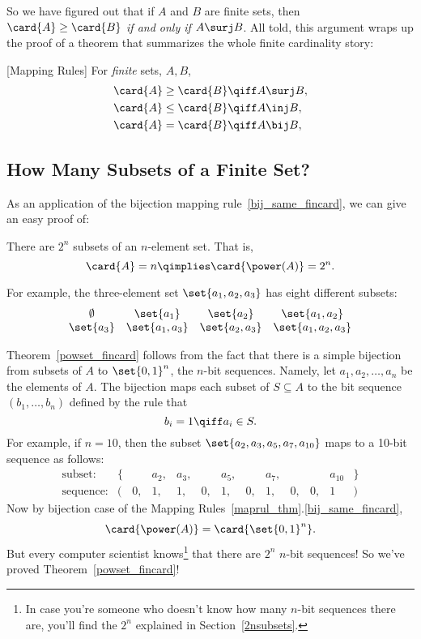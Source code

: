 So we have figured out that if $A$ and $B$ are finite sets, then
$\card{A} \geq \card{B}$ \emph{if and only if} $A \surj B$.  All told,
this argument wraps up the proof of a theorem that summarizes the
whole finite cardinality story:
\begin{theorem}\label{maprul_thm}
[Mapping Rules] \mbox{} For \emph{finite} sets, $A,B$,
\begin{align}
\card{A} \geq \card{B} & \qiff A \surj B,\label{sur_ge_fincard}\\
\card{A} \leq \card{B} & \qiff A \inj B,\label{inj_le_fincard}\\
\card{A} = \card{B} & \qiff A \bij B,\label{bij_same_fincard}
\end{align}
\end{theorem}%
%

\subsection{How Many Subsets of a Finite Set?}
As an application of the bijection mapping%
rule~\eqref{bij_same_fincard}, we can give an easy proof of:
\begin{theorem}\label{powset_fincard}
There are $2^n$ subsets of an $n$-element set.  That is,
\[
\card{A} = n \qimplies \card{\power(A)} = 2^n.
\]
\end{theorem}

For example, the three-element set $\set{a_1, a_2, a_3}$ has eight
different subsets: %
\[
\begin{array}{cccc}
\emptyset & \set{a_1} & \set{a_2} & \set{a_1, a_2} \\ \set{a_3} &
\set{a_1, a_3} & \set{a_2, a_3} & \set{a_1, a_2, a_3}
\end{array}
\]

Theorem~\ref{powset_fincard} follows from the fact that there is a
simple bijection from subsets of $A$ to $\set{0,1}^n$, the $n$-bit
sequences.  Namely, let $a_1, a_2, \dots, a_n$ be the elements of $A$.
The bijection maps each subset of $S \subseteq A$ to the bit sequence
$(b_1, \dots, b_n)$ defined by the rule that
\[
b_i = 1 \qiff a_i \in S.
\]
For example, if $n = 10$, then the subset $\set{a_2, a_3, a_5, a_7,
  a_{10}}$ maps to a 10-bit sequence as follows: %
\[
\begin{array}{rrrrrrrrrrrrr}
\text{subset:} & \{ & & a_2, & a_3, & & a_5, & & a_7, & & & a_{10} &
\} \\ \text{sequence:} & ( & 0, & 1, & 1, & 0, & 1, & 0, & 1, & 0, &
0, & 1 & )
\end{array}
\]
Now by bijection case of the Mapping Rules~\ref{maprul_thm}.\eqref{bij_same_fincard},
\[
\card{\power(A)} = \card{\set{0,1}^n}.
\]
But every computer scientist knows\footnote{In case you're someone who
  doesn't know how many $n$-bit sequences there are, you'll find the
  $2^n$ explained in Section~\ref{2nsubsets}.}
  that there are $2^n$ $n$-bit sequences!  So we've proved
  Theorem~\ref{powset_fincard}!

\begin{problems}
\practiceproblems
{}

\classproblems
{}

\end{problems}

\endinput
